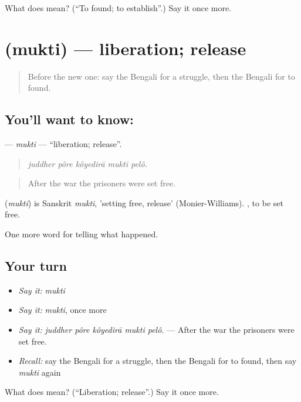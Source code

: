 \begin{tcolorbox}[breakable,colback=teal!4,colframe=teal!35!black,title={Before you move on}]
What does   mean? (\textquotedblleft{}To found; to establish\textquotedblright{}.) Say it once more.
\end{tcolorbox}
\section[\texorpdfstring{\bn{মুক্তি} (mukti)}{মুক্তি (mukti)}]{ (mukti) — liberation; release}

\label{lesson:BN-C318-mukti}



\begin{quote}
Before the new one: say the Bengali for a struggle, then the Bengali for to found.
\end{quote}

\subsection*{You'll want to know: }
\textbf{} — \emph{mukti} — \textquotedblleft{}liberation; release\textquotedblright{}.

\begin{quote}
    
\end{quote}

\begin{quote}
\emph{juddher pôre kôyedirā mukti pelô.}
\end{quote}

\begin{quote}
After the war the prisoners were set free.
\end{quote}

\begin{cousinweb}
\textbf{} (\emph{mukti}) is Sanskrit \emph{mukti}, 'setting free, release' (Monier-Williams).  , to be set free.
\end{cousinweb}

\begin{grammarlens}[title={What you've built}]
One more word for telling what happened.
\end{grammarlens}

\subsection*{Your turn}
\begin{itemize}
\raggedright
  \item \emph{Say it:} \emph{mukti}
  \item \emph{Say it:} \emph{mukti}, once more
  \item \emph{Say it:} \emph{juddher pôre kôyedirā mukti pelô.} — After the war the prisoners were set free.
  \item \emph{Recall:} say the Bengali for a struggle, then the Bengali for to found, then say \emph{mukti} again
\end{itemize}

\begin{tcolorbox}[breakable,colback=teal!4,colframe=teal!35!black,title={Before you move on}]
What does  mean? (\textquotedblleft{}Liberation; release\textquotedblright{}.) Say it once more.
\end{tcolorbox}
